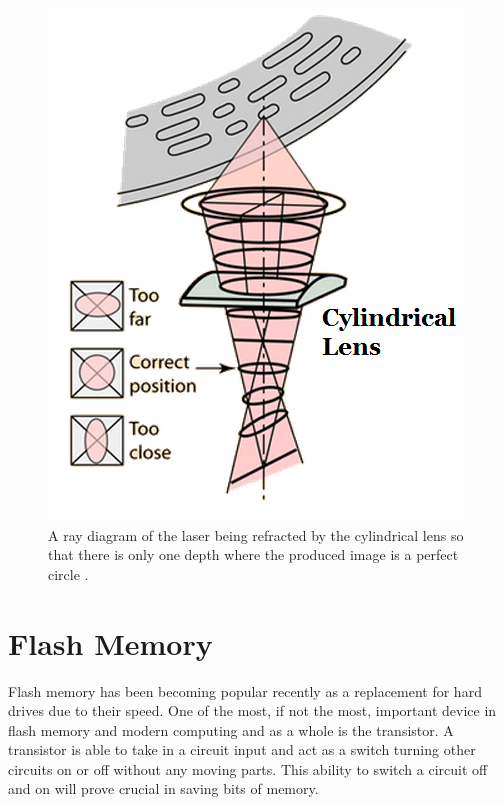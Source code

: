 \documentclass[ notitlepage, numerical, 11pt]{revtex4-1} %
\begin{document}
\begin{figure}[H]
\centerline{\includegraphics[scale=.5]{rayDiagram.png}}
\caption{A ray diagram of the laser being refracted by the cylindrical lens so that there is only one depth where the produced image is a perfect circle \cite {hyper}.}
\label{focus2}
\end{figure} 

\section{Flash Memory}
Flash memory has been becoming popular recently as a replacement for hard drives due to their speed. One of the most, if not the most, important device in flash memory and modern computing and as a whole is the transistor. A transistor is able to take in a circuit input and act as a switch turning other circuits on or off without any moving parts. This ability to switch a circuit off and on will prove crucial in saving bits of memory.
\end{document}

